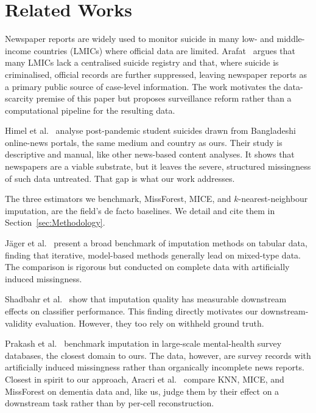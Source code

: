 \documentclass[conference]{IEEEtran}
\begin{document}
\section{Related Works}
\label{sec:related-works}

Newspaper reports are widely used to monitor suicide in many low- and middle-income countries (LMICs) where official data are limited. Arafat~\cite{arafat2025surveillance} argues that many LMICs lack a centralised suicide registry and that, where suicide is criminalised, official records are further suppressed, leaving newspaper reports as a primary public source of case-level information. The work motivates the data-scarcity premise of this paper but proposes surveillance reform rather than a computational pipeline for the resulting data.

Himel et al.~\cite{himel2024studentnews} analyse post-pandemic student suicides drawn from Bangladeshi online-news portals, the same medium and country as ours. Their study is descriptive and manual, like other news-based content analyses. It shows that newspapers are a viable substrate, but it leaves the severe, structured missingness of such data untreated. That gap is what our work addresses.

The three estimators we benchmark, MissForest, MICE, and $k$-nearest-neighbour imputation, are the field's de facto baselines. We detail and cite them in Section~\ref{sec:Methodology}.

J\"ager et al.~\cite{jager2021benchmark} present a broad benchmark of imputation methods on tabular data, finding that iterative, model-based methods generally lead on mixed-type data. The comparison is rigorous but conducted on complete data with artificially induced missingness.

Shadbahr et al.~\cite{shadbahr2023imputationquality} show that imputation quality has measurable downstream effects on classifier performance. This finding directly motivates our downstream-validity evaluation. However, they too rely on withheld ground truth.

Prakash et al.~\cite{prakash2025mentalhealthimpute} benchmark imputation in large-scale mental-health survey databases, the closest domain to ours. The data, however, are survey records with artificially induced missingness rather than organically incomplete news reports. Closest in spirit to our approach, Aracri et al.~\cite{aracri2025imputation} compare KNN, MICE, and MissForest on dementia data and, like us, judge them by their effect on a downstream task rather than by per-cell reconstruction.
\end{document}

